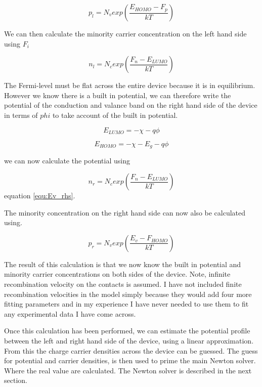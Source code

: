 \begin{equation}
p_{l}=N_v exp \left(\frac{E_{HOMO}-F_p}{kT} \right)
\end{equation}

We can then calculate the minority carrier concentration on the left hand side using $F_i$

\begin{equation}
n_{l}=N_c exp \left (\frac{F_n-E_{LUMO}}{kT} \right)
\end{equation}

The Fermi-level must be flat across the entire device because it is in equilibrium.  However we know there is a built in potential, we can therefore write the potential of the conduction and valance band on the right hand side of the device in terms of $phi$ to take account of the built in potential.

\begin{equation}
E_{LUMO}=-\chi-q\phi
\label{equ:Ev_rhs}
\end{equation}

\begin{equation}
E_{HOMO}=-\chi-E_g-q\phi
\end{equation}

we can now calculate the potential using

\begin{equation}
n_{r}=N_c exp \left (\frac{F_n-E_{LUMO}}{kT} \right)
\end{equation}
equation \ref{equ:Ev_rhs}.

The minority concentration on the right hand side can now also be calculated using.

\begin{equation}
p_{r}=N_v exp \left (\frac{E_v-F_{HOMO}}{kT} \right)
\end{equation}

The result of this calculation is that we now know the built in potential and minority carrier concentrations on both sides of the device.  Note, infinite recombination velocity on the contacts is assumed.  I have not included finite recombination velocities in the model simply because they would add four more fitting parameters and in my experience I have never needed to use them to fit any experimental data I have come across.

Once this calculation has been performed, we can estimate the potential profile between the left and right hand side of the device, using a linear approximation. From this the charge carrier densities across the device can be guessed.  The guess for potential and carrier densities, is then used to prime the main Newton solver.  Where the real value are calculated.  The Newton solver is described in the next section.



